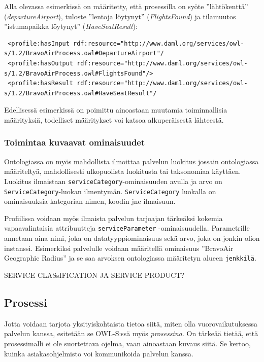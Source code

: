\documentclass[finnish]{tktltiki2}
\theoremstyle{definition}
\theoremstyle{remark}
\begin{document}
Alla olevassa esimerkissä on määritetty, että prosessilla on syöte ''lähtökenttä'' (\textit{departureAirport}), tuloste ''lentoja löytynyt'' (\textit{FlightsFound}) ja 
tilamuutos ''istumapaikka löytynyt'' (\textit{HaveSeatResult})\cite{daml}:

\begin{verbatim}
 <profile:hasInput rdf:resource="http://www.daml.org/services/owl-s/1.2/BravoAirProcess.owl#DepartureAirport"/
 <profile:hasOutput rdf:resource="http://www.daml.org/services/owl-s/1.2/BravoAirProcess.owl#FlightsFound"/>
 <profile:hasResult rdf:resource="http://www.daml.org/services/owl-s/1.2/BravoAirProcess.owl#HaveSeatResult"/
\end{verbatim}

Edellisessä esimerkissä on poimittu ainoastaan muutamia toiminnallisia määrityksiä, todelliset määritykset voi katsoa alkuperäisestä lähteestä\cite{daml}. 

\subsubsection{Toimintaa kuvaavat ominaisuudet}

Ontologiassa on myös mahdollista ilmoittaa palvelun luokitus jossain ontologiassa määriteltyä, mahdollisesti ulkopuolista luokitusta tai taksonomiaa käyttäen. Luokitus ilmaistaan \texttt{serviceCategory}-ominaisuuden avulla ja arvo on \texttt{ServiceCategory}-luokan ilmentymän.  \texttt{ServiceCategory} luokalla on ominaisuuksia kategorian nimen, koodin jne ilmaisuun\cite{OWLS}.

Profiilissa voidaan myös ilmaista palvelun tarjoajan tärkeäksi kokemia vapaavalintaisia attribuutteja \texttt{serviceParameter} -ominaisuudella. Parametrille annetaan aina nimi, joka on datatyyppiominaisuus sekä arvo, joka on jonkin olion instanssi\cite{OWLS}. Esimerkiksi palvelulle voidaan määritellä ominaisuus ''BravoAir Geographic Radius'' ja se saa arvoksen ontologiassa määritetyn alueen \texttt{jenkkilä}.

SERVICE CLASsIFICATION JA SERVICE PRODUCT?

\subsection{Prosessi}

Jotta voidaan tarjota yksityiskohtaista tietoa siitä, miten olla vuorovaikutuksessa palvelun kanssa, esitetään se OWL-S:ssä myös \textit{prosessina}. On tärkeää tietää, että prosessimalli ei ole suortettava ojelma, vaan ainoastaan kuvaus siitä\cite{OWLS}. Se kertoo, kuinka asiakasohjelmisto voi kommunikoida palvelun kanssa. 
\end{document}
